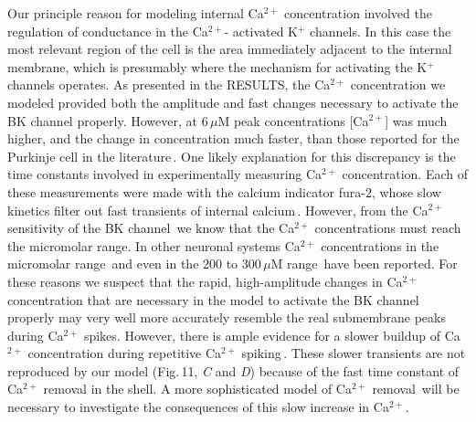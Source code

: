 \documentclass[12pt]{article}
\begin{document}
Our principle reason for modeling internal Ca$^{2+}$ concentration
involved the regulation of conductance in the Ca$^{2+}$-
activated K$^+$ channels. In this case the most relevant region
of the cell is the area immediately adjacent to the internal
membrane, which is presumably where the mechanism for
activating the K$^+$ channels operates. As presented in the
RESULTS, the Ca$^{2+}$ concentration we modeled provided
both the amplitude and fast changes necessary to activate
the BK channel properly. However, at 6\,$\mu$M peak concentrations
[Ca$^{2+}$] was much higher, and the change in concentration
much faster, than those reported for the Purkinje
cell in the literature\,\cite{Hockberger:1989ve, Ross:339qf, Sugimori:1990kx, Tank:1988bh}. One
likely explanation for this discrepancy is the time constants
involved in experimentally measuring Ca$^{2+}$ concentration.
Each of these measurements were made with the calcium
indicator fura-2, whose slow kinetics filter out fast transients
of internal calcium\,\cite{Vranesic:1991dq}.
However, from the Ca$^{2+}$ sensitivity of the BK channel\,\cite{Franciolini:1988fu, Lancaster:1991ye, Reinhart1989:xe, Smart:1987mi} we know that the Ca$^{2+}$ concentrations
must reach the micromolar range. In other neuronal systems
Ca$^{2+}$ concentrations in the micromolar range\,\cite{Muller:1991cr} 
and even in the 200 to 300\,$\mu$M range\,\cite{Llinas:1992nx} 
have been reported. For these reasons
we suspect that the rapid, high-amplitude changes in Ca$^{2+}$
concentration that are necessary in the model to activate
the BK channel properly may very well more accurately
resemble the real submembrane peaks during Ca$^{2+}$ spikes.
However, there is ample evidence for a slower buildup of
Ca$^{2+}$ concentration during repetitive Ca$^{2+}$ spiking\,\cite{Lev-Ram:1992vn, Ross:1990oq}. 
These slower transients
are not reproduced by our model (Fig.\,11, {\it C} and {\it D}) because
of the fast time constant of Ca$^{2+}$ removal in the shell.
A more sophisticated model of Ca$^{2+}$ removal\,\cite{Sala:1990ys, Yamada-W:1989bs} will be necessary
to investigate the consequences of this slow increase
in Ca$^{2+}$.



\end{document}
